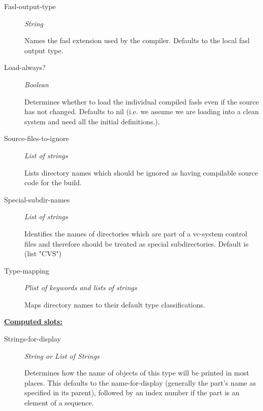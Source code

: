 \documentclass [11pt]{book}
\begin{document}
\begin{itemize}
\begin{description}
\item [Fasl-output-type]
\emph{String}

 Names the fasl extension used by the compiler. Defaults to the local fasl output type.




\item [Load-always?]
\emph{Boolean}

 Determines whether to load the individual compiled fasls even if the source has not changed.
Defaults to nil (i.e. we assume we are loading into a clean system and need all the initial definitions.).




\item [Source-files-to-ignore]
\emph{List of strings}

 Lists directory names which should be ignored as having
compilable source code for the build.




\item [Special-subdir-names]
\emph{List of strings}

 Identifies the names of directories which are part of a vc-system control files
and therefore should be treated as special subdirectories.
Default is (list "CVS")




\item [Type-mapping]
\emph{Plist of keywords and lists of strings}

 Maps directory names to their default type classifications.




\end{description}






\textbf{
\underline{Computed slots:}}

\begin{description}

\item [Strings-for-display]
\emph{String or List of Strings}

 Determines how the name of objects of this type will be printed in most places.
This defaults to the name-for-display (generally the part's name as specified in its
parent), followed by an index number if the part is an element of a sequence.




\end{description}







\end{itemize}
\end{document}
